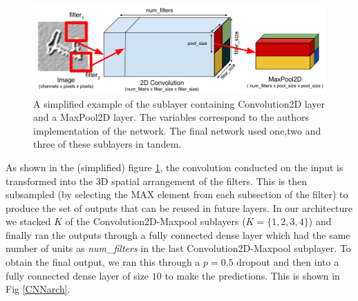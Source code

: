 \documentclass[conference]{IEEEtran}
\begin{document}
\begin{figure}[h]

	\includegraphics[scale=0.40]{convnet_example.pdf}
	\caption{A simplified example of the sublayer containing Convolution2D layer and a MaxPool2D layer. The variables correspond to the authors implementation of the network. The final network used one,two and three of these sublayers in tandem.}
	\label{convmaxlayer}
\end{figure}

As shown in the (simplified) figure \ref{convmaxlayer}, the convolution conducted on the input is transformed into the 3D spatial arrangement of the filters. This is then subsampled (by selecting the MAX element from each subsection of the filter) to produce the set of outputs that can be reused in future layers. In our architecture we stacked $K$ of the Convolution2D-Maxpool sublayers ($K=\{1,2,3,4\}$) and finally ran the outputs through a fully connected dense layer which had the same number of units as \emph{num\_filters} in the last Convolution2D-Maxpool subplayer. To obtain the final output, we ran this through a $p=0.5$ dropout and then into a fully connected dense layer of size $10$ to make the predictions. This is shown in Fig \ref{CNNarch}. 
\end{document}
